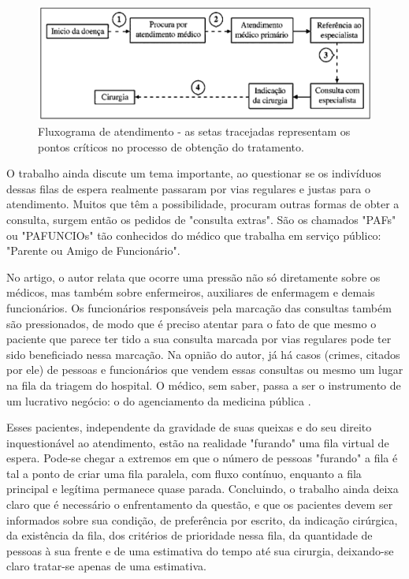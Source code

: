     \begin{figure}[htbp]
        	\centering
            \caption{Fluxograma de atendimento - as setas tracejadas representam os pontos críticos no processo de obtenção do tratamento.}
            \label{fig:images/fluxo-fila-cirurgia-otorrino}
            \includegraphics[width=0.9\linewidth]{images/fluxo-fila-cirurgia-otorrino.png}
        \end{figure}
        
    O trabalho ainda discute um tema importante, ao questionar se os indivíduos dessas filas de espera realmente passaram por vias regulares e justas para o atendimento. Muitos que têm a possibilidade, procuram outras formas de obter a consulta, surgem então os pedidos de "consulta extras". São os chamados "PAFs" ou "PAFUNCIOs" tão conhecidos do médico que trabalha em serviço público: "Parente ou Amigo de Funcionário".

    No artigo, o autor relata que ocorre uma pressão não só diretamente sobre os médicos, mas também sobre enfermeiros, auxiliares de enfermagem e demais funcionários. Os funcionários responsáveis pela marcação das consultas também são pressionados, de modo que é preciso atentar para o fato de que mesmo o paciente que parece ter tido a sua consulta marcada por vias regulares pode ter sido beneficiado nessa marcação. Na opnião do autor, já há casos (crimes, citados por ele) de pessoas e funcionários que vendem essas consultas ou mesmo um lugar na fila da triagem do hospital. O médico, sem saber, passa a ser o instrumento de um lucrativo negócio: o do agenciamento da medicina pública \cite{KRISHNAMURTI2005}.
    
    Esses pacientes, independente da gravidade de suas queixas e do seu direito inquestionável ao atendimento, estão na realidade "furando" uma fila virtual de espera. Pode-se chegar a extremos em que o número de pessoas "furando" a fila é tal a ponto de criar uma fila paralela, com fluxo contínuo, enquanto a fila principal e legítima permanece quase parada. Concluindo, o trabalho ainda deixa claro que é necessário o enfrentamento da questão, e que os pacientes devem ser informados sobre sua condição, de preferência por escrito, da indicação cirúrgica, da existência da fila, dos critérios de prioridade nessa fila, da quantidade de pessoas à sua frente e de uma estimativa do tempo até sua cirurgia, deixando-se claro tratar-se apenas de uma estimativa.
    
